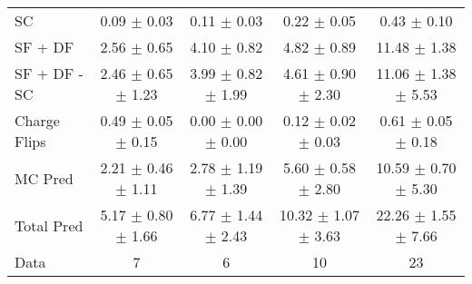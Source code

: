 \begin{tabular}{l|cccc}
                                 SC &  0.09 $\pm$  0.03 &  0.11 $\pm$  0.03 &  0.22 $\pm$  0.05 &  0.43 $\pm$  0.10 \\
                            SF + DF &  2.56 $\pm$  0.65 &  4.10 $\pm$  0.82 &  4.82 $\pm$  0.89 & 11.48 $\pm$  1.38 \\
\hline
                       SF + DF - SC &  2.46 $\pm$  0.65 $\pm$  1.23 &  3.99 $\pm$  0.82 $\pm$  1.99 &  4.61 $\pm$  0.90 $\pm$  2.30 & 11.06 $\pm$  1.38 $\pm$  5.53 \\
\hline\hline
                       Charge Flips &  0.49 $\pm$  0.05 $\pm$  0.15 &  0.00 $\pm$  0.00 $\pm$  0.00 &  0.12 $\pm$  0.02 $\pm$  0.03 &  0.61 $\pm$  0.05 $\pm$  0.18 \\
\hline
                            MC Pred &  2.21 $\pm$  0.46 $\pm$  1.11 &  2.78 $\pm$  1.19 $\pm$  1.39 &  5.60 $\pm$  0.58 $\pm$  2.80 & 10.59 $\pm$  0.70 $\pm$  5.30 \\
\hline
                         Total Pred &  5.17 $\pm$  0.80 $\pm$  1.66 &  6.77 $\pm$  1.44 $\pm$  2.43 & 10.32 $\pm$  1.07 $\pm$  3.63 & 22.26 $\pm$  1.55 $\pm$  7.66 \\
\hline\hline
                               Data &     7 &     6 &    10 &    23 \\
\hline\hline
\end{tabular}

